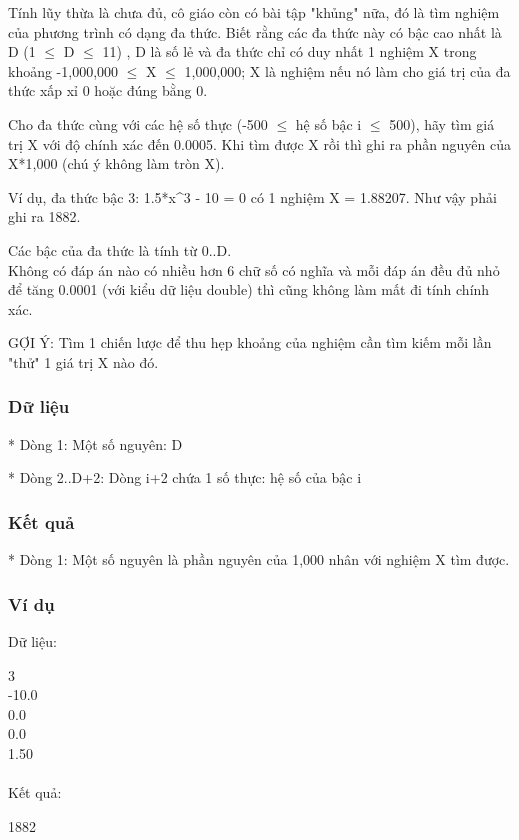 



   Tính lũy thừa là chưa đủ, cô giáo còn có bài tập "khủng" nữa, đó là tìm nghiệm của phương trình có dạng đa thức. Biết rằng các đa thức này có bậc cao nhất là D (1  $\le$  D  $\le$  11) , D là số lẻ và đa thức chỉ có duy nhất 1 nghiệm X trong khoảng -1,000,000  $\le$  X  $\le$  1,000,000; X là nghiệm nếu nó làm cho giá trị của đa thức xấp xỉ 0 hoặc đúng bằng 0.  

   Cho đa thức cùng với các hệ số thực (-500  $\le$  hệ số bậc i  $\le$  500), hãy tìm giá trị X với độ chính xác đến 0.0005. Khi tìm được X rồi thì ghi ra phần nguyên của X*1,000 (chú ý không làm tròn X).  

   Ví dụ, đa thức bậc 3: 1.5*x\textasciicircum3 - 10 = 0 có 1 nghiệm X = 1.88207. Như vậy phải ghi ra 1882.  

   Các bậc của đa thức là tính từ 0..D.   
\\

   Không có đáp án nào có nhiều hơn 6 chữ số có nghĩa và mỗi đáp án đều đủ nhỏ  để tăng 0.0001 (với kiểu dữ liệu double) thì cũng không làm mất đi tính chính xác.  

   GỢI Ý: Tìm 1 chiến lược để thu hẹp khoảng của nghiệm cần tìm kiếm mỗi lần "thử" 1 giá trị X nào đó.  

\subsubsection{   Dữ liệu  }

   * Dòng 1: Một số nguyên: D  

   * Dòng 2..D+2: Dòng i+2 chứa 1 số thực: hệ số của bậc i  

\subsubsection{   Kết quả  }

   * Dòng 1: Một số nguyên là phần nguyên của 1,000 nhân với nghiệm X tìm được.  

\subsubsection{   Ví dụ  }

   Dữ liệu:  

   3   
\\   -10.0   
\\   0.0   
\\   0.0   
\\   1.50   
\\


\\   Kết quả:  

   1882  
